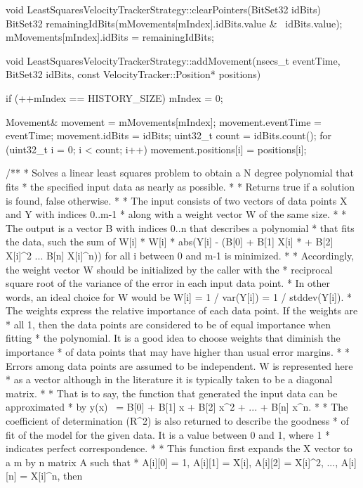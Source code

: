 void LeastSquaresVelocityTrackerStrategy::clearPointers(BitSet32 idBits) {
    BitSet32 remainingIdBits(mMovements[mIndex].idBits.value & ~idBits.value);
    mMovements[mIndex].idBits = remainingIdBits;
}

void LeastSquaresVelocityTrackerStrategy::addMovement(nsecs_t eventTime, BitSet32 idBits,
                                                      const VelocityTracker::Position* positions) {
    if (++mIndex == HISTORY_SIZE) {
        mIndex = 0;
    }
    
    Movement& movement = mMovements[mIndex];
    movement.eventTime = eventTime;
    movement.idBits = idBits;
    uint32_t count = idBits.count();
    for (uint32_t i = 0; i < count; i++) {
        movement.positions[i] = positions[i];
    }
}

/**
 * Solves a linear least squares problem to obtain a N degree polynomial that fits
 * the specified input data as nearly as possible.
 *
 * Returns true if a solution is found, false otherwise.
 *
 * The input consists of two vectors of data points X and Y with indices 0..m-1
 * along with a weight vector W of the same size.
 *
 * The output is a vector B with indices 0..n that describes a polynomial
 * that fits the data, such the sum of W[i] * W[i] * abs(Y[i] - (B[0] + B[1] X[i]
 * + B[2] X[i]^2 ... B[n] X[i]^n)) for all i between 0 and m-1 is minimized.
 *
 * Accordingly, the weight vector W should be initialized by the caller with the
 * reciprocal square root of the variance of the error in each input data point.
 * In other words, an ideal choice for W would be W[i] = 1 / var(Y[i]) = 1 / stddev(Y[i]).
 * The weights express the relative importance of each data point.  If the weights are
 * all 1, then the data points are considered to be of equal importance when fitting
 * the polynomial.  It is a good idea to choose weights that diminish the importance
 * of data points that may have higher than usual error margins.
 *
 * Errors among data points are assumed to be independent.  W is represented here
 * as a vector although in the literature it is typically taken to be a diagonal matrix.
 *
 * That is to say, the function that generated the input data can be approximated
 * by y(x) ~= B[0] + B[1] x + B[2] x^2 + ... + B[n] x^n.
 *
 * The coefficient of determination (R^2) is also returned to describe the goodness
 * of fit of the model for the given data.  It is a value between 0 and 1, where 1
 * indicates perfect correspondence.
 *
 * This function first expands the X vector to a m by n matrix A such that
 * A[i][0] = 1, A[i][1] = X[i], A[i][2] = X[i]^2, ..., A[i][n] = X[i]^n, then
